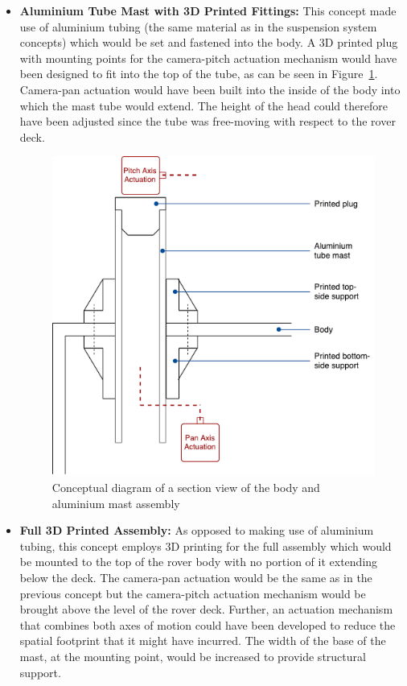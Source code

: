       \begin{itemize}
        \item \textbf{Aluminium Tube Mast with 3D Printed Fittings:} This concept made use of aluminium tubing (the same material as in the suspension system concepts) which would be set and fastened into the body. A 3D printed plug with mounting points for the camera-pitch actuation mechanism would have been designed to fit into the top of the tube, as can be seen in Figure~\ref{fig:concepts-aluMast}. Camera-pan actuation would have been built into the inside of the body into which the mast tube would extend. The height of the head could therefore have been adjusted since the tube was free-moving with respect to the rover deck.
        
        \begin{figure}[H]
          \centering
          \includegraphics[width=0.7\linewidth]{figures/concepts-aluMast}
          \caption[Conceptual diagram of a section view of the body and aluminium mast assembly]{Conceptual diagram of a section view of the body and aluminium mast assembly}
          \label{fig:concepts-aluMast}
        \end{figure}
        
        \item \textbf{Full 3D Printed Assembly:} As opposed to making use of aluminium tubing, this concept employs 3D printing for the full assembly which would be mounted to the top of the rover body with no portion of it extending below the deck. The camera-pan actuation would be the same as in the previous concept but the camera-pitch actuation mechanism would be brought above the level of the rover deck. Further, an actuation mechanism that combines both axes of motion could have been developed to reduce the spatial footprint that it might have incurred. The width of the base of the mast, at the mounting point, would be increased to provide structural support.
        

\end{itemize}
